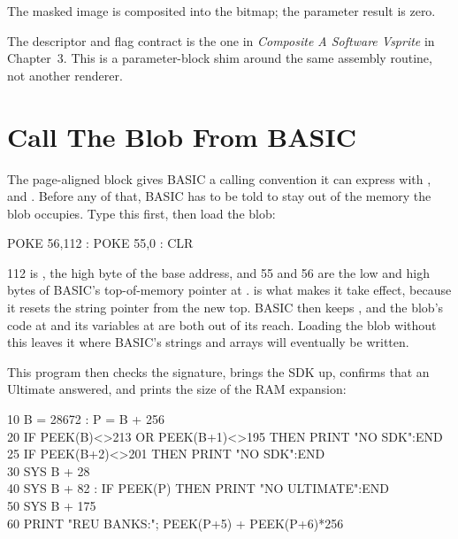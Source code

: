 \begin{resultbox}
The masked image is composited into the bitmap; the parameter result is zero.
\end{resultbox}

The descriptor and flag contract is the one in \emph{Composite A Software
Vsprite} in Chapter~3. This is a parameter-block shim around the same assembly
routine, not another renderer.


\section{Call The Blob From BASIC}

The page-aligned block gives BASIC a calling convention it can express with
,  and . Before any of that, BASIC has to be told
to stay out of the memory the blob occupies. Type this first, then load the
blob:

\begin{screen}
POKE 56,112 : POKE 55,0 : CLR
\end{screen}

112 is , the high byte of the base address, and 55 and 56 are the low
and high bytes of BASIC's top-of-memory pointer at . 
is what makes it take effect, because it resets the string pointer from the new
top. BASIC then keeps , and the blob's code at 
and its variables at  are both out of its reach. Loading the blob
without this leaves it where BASIC's strings and arrays will eventually be
written.

This program then checks the signature, brings the SDK up, confirms that an
Ultimate answered, and prints the size of the RAM expansion:

\begin{screen}
10 B = 28672 : P = B + 256\\
20 IF PEEK(B)<>213 OR PEEK(B+1)<>195 THEN PRINT "NO SDK":END\\
25 IF PEEK(B+2)<>201 THEN PRINT "NO SDK":END\\
30 SYS B + 28\\
40 SYS B + 82 : IF PEEK(P) THEN PRINT "NO ULTIMATE":END\\
50 SYS B + 175\\
60 PRINT "REU BANKS:"; PEEK(P+5) + PEEK(P+6)*256
\end{screen}

